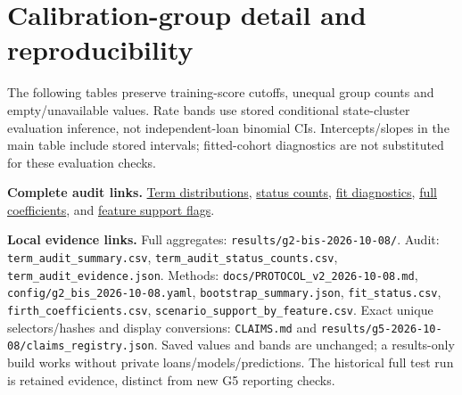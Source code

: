 \section{Calibration-group detail and reproducibility}
The following tables preserve training-score cutoffs, unequal group counts and empty/unavailable values. Rate bands use stored conditional state-cluster evaluation inference, not independent-loan binomial CIs. Intercepts/slopes in the main table include stored intervals; fitted-cohort diagnostics are not substituted for these evaluation checks.

\textbf{Complete audit links.} \href{../results/g2-bis-2026-10-08/term_audit_summary.csv}{Term distributions}, \href{../results/g2-bis-2026-10-08/term_audit_status_counts.csv}{status counts}, \href{../results/g2-bis-2026-10-08/fit_status.csv}{fit diagnostics}, \href{../results/g2-bis-2026-10-08/firth_coefficients.csv}{full coefficients}, and \href{../results/g2-bis-2026-10-08/scenario_support_by_feature.csv}{feature support flags}.\par\textbf{Local evidence links.} Full aggregates: \nolinkurl{results/g2-bis-2026-10-08/}. Audit: \nolinkurl{term_audit_summary.csv}, \nolinkurl{term_audit_status_counts.csv}, \nolinkurl{term_audit_evidence.json}. Methods: \nolinkurl{docs/PROTOCOL_v2_2026-10-08.md}, \nolinkurl{config/g2_bis_2026-10-08.yaml}, \nolinkurl{bootstrap_summary.json}, \nolinkurl{fit_status.csv}, \nolinkurl{firth_coefficients.csv}, \nolinkurl{scenario_support_by_feature.csv}. Exact unique selectors/hashes and display conversions: \nolinkurl{CLAIMS.md} and \nolinkurl{results/g5-2026-10-08/claims_registry.json}. Saved values and bands are unchanged; a results-only build works without private loans/models/predictions. The historical full test run is retained evidence, distinct from new G5 reporting checks.

